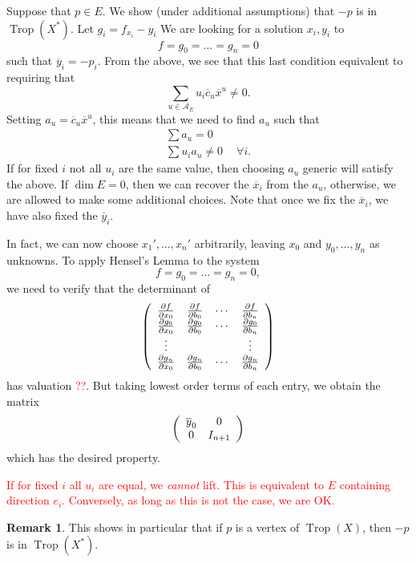 \documentclass[oneside]{amsart}
\newcommand{\A}{\mathcal{A}}
\DeclareMathOperator{\trop}{Trop}
\theoremstyle{definition}
\newtheorem{rem}[thm]{Remark}
\newcommand{\nathan}[1]{\textcolor{red}{#1}}
\begin{document}
Suppose that $p\in E$. We show (under additional assumptions) that $-p$ is in $\trop(X^*)$.
Let $g_i=f_{x_i}-y_i$
We are looking for a solution $x_i,y_i$ to 
\[f=g_0=\ldots=g_n=0\]
such that $\overline{y}_i=-p_i$. From the above, we see that this last condition equivalent to requiring that 
\begin{equation*}
\sum_{u\in\A_E} u_i\overline{c}_u\overline{x}^u\neq0.
\end{equation*}
Setting $a_u=\overline{c}_u\overline{x}^u$, this means that we need to find $a_u$ such that 
\begin{align*}
\sum a_u=0\\
\sum u_i a_u \neq 0\ \quad \forall i.
\end{align*}
If for fixed $i$ not all $u_i$ are the same value, then choosing $a_u$ generic will satisfy the above. If $\dim E=0$, then we can recover the $\overline{x}_i$ from the $a_u$, otherwise, we are allowed to make some additional choices. Note that once we fix the $\overline{x}_i$, we have also fixed the $\overline{y}_i$.

In fact, we can now choose $x_1',\ldots,x_n'$ arbitrarily, leaving $x_0$ and $y_0,\ldots,y_n$ as unknowns. To apply Hensel's Lemma to the system
\[f=g_0=\ldots=g_n=0,\]
we need to verify that the determinant of 
\[
\left(
\begin{array}{c c c c}
\frac{\partial f}{\partial x_0} &  \frac{\partial f}{\partial b_0} & \cdots &\frac{\partial f}{\partial b_n}\\
\frac{\partial g_0}{\partial x_0} &  \frac{\partial g_0}{\partial b_0} & \cdots &\frac{\partial g_0}{\partial b_n}\\
\vdots&&&\vdots\\
\frac{\partial g_n}{\partial x_0} &  \frac{\partial g_n}{\partial b_0} & \cdots &\frac{\partial g_n}{\partial b_n}\\
\end{array}
\right)
\]
has valuation \nathan{??}. But taking lowest order terms of each entry, we obtain the matrix 
\[
\left(
\begin{array}{c c c c}
\overline{y}_0 & 0\\
0 & I_{n+1}
\end{array}
\right)
\]
which has the desired property.

\nathan{If for fixed $i$ all $u_i$ are equal, we \emph{cannot} lift. This is equivalent to $E$ containing direction $e_i$. Conversely, as long as this is not the case, we are OK.}

\begin{rem}
This shows in particular that if $p$ is a vertex of $\trop(X)$, then $-p$ is in $\trop(X^*)$.
\end{rem}
\end{document}

